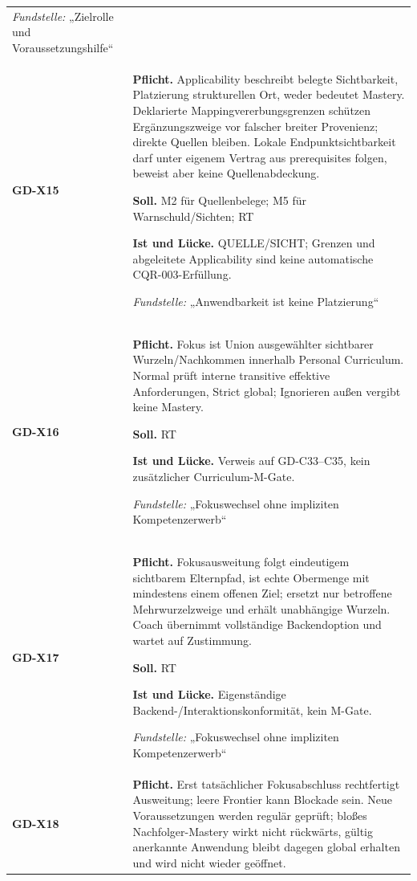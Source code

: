 \begin{longtable}{@{}P{20mm}P{128mm}@{}}
\emph{Fundstelle:} „Zielrolle und Voraussetzungshilfe“\\\addlinespace[5pt]
\label{rule:GD-X15}\textbf{GD-X15} &
\textbf{Pflicht.} Applicability beschreibt belegte Sichtbarkeit, Platzierung strukturellen Ort, weder bedeutet Mastery. Deklarierte Mappingvererbungsgrenzen schützen Ergänzungszweige vor falscher breiter Provenienz; direkte Quellen bleiben. Lokale Endpunktsichtbarkeit darf unter eigenem Vertrag aus prerequisites folgen, beweist aber keine Quellenabdeckung.\par\smallskip
\textbf{Soll.} M2 für Quellenbelege; M5 für Warnschuld/Sichten; RT\par\smallskip
\textbf{Ist und Lücke.} QUELLE/SICHT; Grenzen und abgeleitete Applicability sind keine automatische CQR-003-Erfüllung.\par\smallskip
\emph{Fundstelle:} „Anwendbarkeit ist keine Platzierung“\\\addlinespace[5pt]
\label{rule:GD-X16}\textbf{GD-X16} &
\textbf{Pflicht.} Fokus ist Union ausgewählter sichtbarer Wurzeln/Nachkommen innerhalb Personal Curriculum. Normal prüft interne transitive effektive Anforderungen, Strict global; Ignorieren außen vergibt keine Mastery.\par\smallskip
\textbf{Soll.} RT\par\smallskip
\textbf{Ist und Lücke.} Verweis auf GD-C33–C35, kein zusätzlicher Curriculum-M-Gate.\par\smallskip
\emph{Fundstelle:} „Fokuswechsel ohne impliziten Kompetenzerwerb“\\\addlinespace[5pt]
\label{rule:GD-X17}\textbf{GD-X17} &
\textbf{Pflicht.} Fokusausweitung folgt eindeutigem sichtbarem Elternpfad, ist echte Obermenge mit mindestens einem offenen Ziel; ersetzt nur betroffene Mehrwurzelzweige und erhält unabhängige Wurzeln. Coach übernimmt vollständige Backendoption und wartet auf Zustimmung.\par\smallskip
\textbf{Soll.} RT\par\smallskip
\textbf{Ist und Lücke.} Eigenständige Backend-/Interaktionskonformität, kein M-Gate.\par\smallskip
\emph{Fundstelle:} „Fokuswechsel ohne impliziten Kompetenzerwerb“\\\addlinespace[5pt]
\label{rule:GD-X18}\textbf{GD-X18} &
\textbf{Pflicht.} Erst tatsächlicher Fokusabschluss rechtfertigt Ausweitung; leere Frontier kann Blockade sein. Neue Voraussetzungen werden regulär geprüft; bloßes Nachfolger-Mastery wirkt nicht rückwärts, gültig anerkannte Anwendung bleibt dagegen global erhalten und wird nicht wieder geöffnet.\par\smallskip

\end{longtable}
